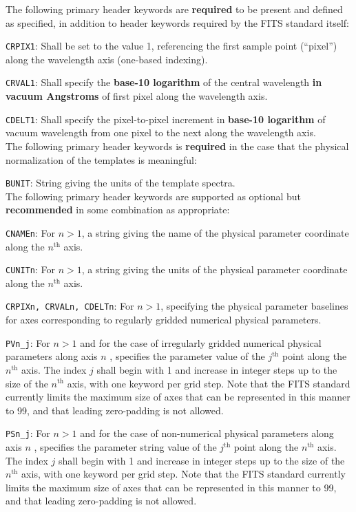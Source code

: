 \documentclass[12pt]{article}
\begin{document}
The following primary header keywords are \textbf{required} to
be present and defined as specified, in addition
to header keywords required by the FITS standard itself:

\noindent \texttt{CRPIX1}: Shall be set to the value 1, referencing the
first sample point (``pixel'') along the wavelength axis (one-based indexing).

\noindent \texttt{CRVAL1}: Shall specify the
\textbf{base-10 logarithm} of the central wavelength
\textbf{in vacuum Angstroms} of first pixel along the wavelength axis.

\noindent \texttt{CDELT1}: Shall specify the pixel-to-pixel
increment in \textbf{base-10 logarithm} of vacuum wavelength from
one pixel to the next along the wavelength axis. \\


The following primary header keywords is \textbf{required} in the
case that the physical normalization of the templates is meaningful:

\noindent \texttt{BUNIT}: String giving the units of the template spectra. \\

The following primary header keywords are supported as
optional but \textbf{recommended}
in some combination as appropriate:

\noindent \texttt{CNAMEn}: For $n > 1$, a string giving the
name of the physical parameter coordinate along the $n^{\mathrm{th}}$ axis.

\noindent \texttt{CUNITn}: For $n > 1$, a string giving the
units of the physical parameter coordinate along the $n^{\mathrm{th}}$ axis.

\noindent \texttt{CRPIXn, CRVALn, CDELTn}: For $n > 1$, specifying
the physical parameter baselines for axes corresponding to
regularly gridded numerical physical parameters.

\noindent \texttt{PVn\_j}: For $n > 1$ and for the case of irregularly gridded
numerical physical parameters along axis $n$ , specifies the parameter value
of the $j^{\mathrm{th}}$ point along the $n^{\mathrm{th}}$ axis.
The index $j$ shall begin with 1 and increase in integer steps up to the
size of the $n^{\mathrm{th}}$ axis, with one keyword per grid step.
Note that the FITS standard currently limits the maximum size of axes
that can be represented in this manner to 99, and that leading zero-padding
is not allowed.

\noindent \texttt{PSn\_j}: For $n > 1$ and for the case of non-numerical
physical parameters along axis $n$ , specifies the parameter string value
of the $j^{\mathrm{th}}$ point along the $n^{\mathrm{th}}$ axis.
The index $j$ shall begin with 1 and increase in integer steps up to the
size of the $n^{\mathrm{th}}$ axis, with one keyword per grid step.
Note that the FITS standard currently limits the maximum size of axes
that can be represented in this manner to 99, and that leading zero-padding
is not allowed.
\end{document}
